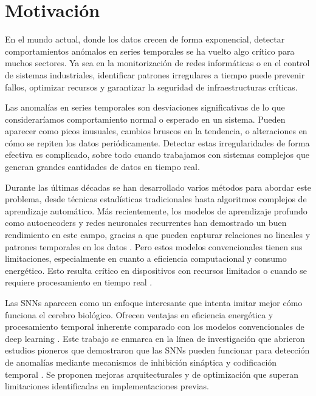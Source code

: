 \section{Motivación}

En el mundo actual, donde los datos crecen de forma exponencial, detectar comportamientos anómalos en series temporales se ha vuelto algo crítico para muchos sectores. Ya sea en la monitorización de redes informáticas o en el control de sistemas industriales, identificar patrones irregulares a tiempo puede prevenir fallos, optimizar recursos y garantizar la seguridad de infraestructuras críticas.

Las anomalías en series temporales son desviaciones significativas de lo que consideraríamos comportamiento normal o esperado en un sistema. Pueden aparecer como picos inusuales, cambios bruscos en la tendencia, o alteraciones en cómo se repiten los datos periódicamente. Detectar estas irregularidades de forma efectiva es complicado, sobre todo cuando trabajamos con sistemas complejos que generan grandes cantidades de datos en tiempo real. 

Durante las últimas décadas se han desarrollado varios métodos para abordar este problema, desde técnicas estadísticas tradicionales hasta algoritmos complejos de aprendizaje automático. Más recientemente, los modelos de aprendizaje profundo como autoencoders y redes neuronales recurrentes han demostrado un buen rendimiento en este campo, gracias a que pueden capturar relaciones no lineales y patrones temporales en los datos \cite{cherdo_time_2023,kshirasagar_auditory_2024}. Pero estos modelos convencionales tienen sus limitaciones, especialmente en cuanto a eficiencia computacional y consumo energético. Esto resulta crítico en dispositivos con recursos limitados o cuando se requiere procesamiento en tiempo real \cite{kshirasagar_auditory_2024,plummer_2d_2025}. 

Las SNNs aparecen como un enfoque interesante que intenta imitar mejor cómo funciona el cerebro biológico. Ofrecen ventajas en eficiencia energética y procesamiento temporal inherente comparado con los modelos convencionales de deep learning \cite{lv_efficient_2024,yusob_anomaly_2018,basler_unsupervised_2022}. Este trabajo se enmarca en la línea de investigación que abrieron estudios pioneros que demostraron que las SNNs pueden funcionar para detección de anomalías mediante mecanismos de inhibición sináptica y codificación temporal \cite{cherdo_time_2023,yusob_anomaly_2018,basler_unsupervised_2022}. Se proponen mejoras arquitecturales y de optimización que superan limitaciones identificadas en implementaciones previas. 

